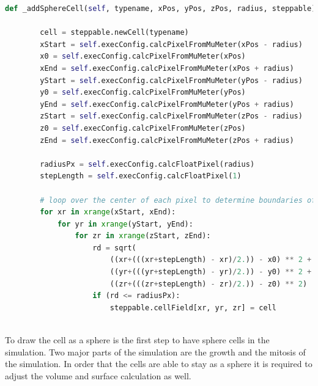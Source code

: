 \begin{lstlisting}[language=Python, caption = Function to draw a cell as a sphere. First all required points for the calculation are converted into the voxel unit. Then over each axis is iterated. During these iterations for each voxel the distance to the center of the cuboid and sphere is calculated and then it is checked if the voxel is within the sphere or not. If the voxel is a part of the sphere it will be added to the sphere.]
    def _addSphereCell(self, typename, xPos, yPos, zPos, radius, steppable):
    
        cell = steppable.newCell(typename)
        xStart = self.execConfig.calcPixelFromMuMeter(xPos - radius)
        x0 = self.execConfig.calcPixelFromMuMeter(xPos)
        xEnd = self.execConfig.calcPixelFromMuMeter(xPos + radius)
        yStart = self.execConfig.calcPixelFromMuMeter(yPos - radius)
        y0 = self.execConfig.calcPixelFromMuMeter(yPos)
        yEnd = self.execConfig.calcPixelFromMuMeter(yPos + radius)
        zStart = self.execConfig.calcPixelFromMuMeter(zPos - radius)
        z0 = self.execConfig.calcPixelFromMuMeter(zPos)
        zEnd = self.execConfig.calcPixelFromMuMeter(zPos + radius)

        radiusPx = self.execConfig.calcFloatPixel(radius)
        stepLength = self.execConfig.calcFloatPixel(1)
        
        # loop over the center of each pixel to determine boundaries of the circle
        for xr in xrange(xStart, xEnd):
            for yr in xrange(yStart, yEnd):
                for zr in xrange(zStart, zEnd):
                    rd = sqrt(
                        ((xr+(((xr+stepLength) - xr)/2.)) - x0) ** 2 +
                        ((yr+(((yr+stepLength) - yr)/2.)) - y0) ** 2 +
                        ((zr+(((zr+stepLength) - zr)/2.)) - z0) ** 2)
                    if (rd <= radiusPx):
                        steppable.cellField[xr, yr, zr] = cell
                        
\end{lstlisting}

To draw the cell as a sphere is the first step to have sphere cells in the simulation. Two major parts of the simulation are the growth and the mitosis of the simulation. In order that the cells are able to stay as a sphere it is required to adjust the volume and surface calculation as well.


